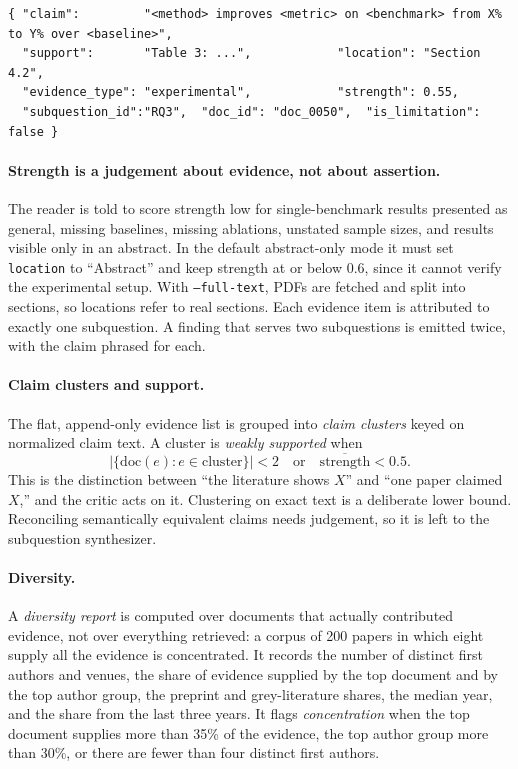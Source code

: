 \documentclass{article}
\newcommand{\code}[1]{\texttt{#1}}
\begin{document}
\begin{lstlisting}[caption={An evidence item (fields abridged).},label={lst:evidence},captionpos=b]
{ "claim":         "<method> improves <metric> on <benchmark> from X% to Y% over <baseline>",
  "support":       "Table 3: ...",            "location": "Section 4.2",
  "evidence_type": "experimental",            "strength": 0.55,
  "subquestion_id":"RQ3",  "doc_id": "doc_0050",  "is_limitation": false }
\end{lstlisting}

\paragraph{Strength is a judgement about evidence, not about assertion.}
The reader is told to score strength low for single-benchmark results
presented as general, missing baselines, missing ablations, unstated
sample sizes, and results visible only in an abstract. In the default
abstract-only mode it must set \code{location} to ``Abstract'' and keep
strength at or below $0.6$, since it cannot verify the experimental setup.
With \code{--full-text}, PDFs are fetched and split into sections, so
locations refer to real sections. Each evidence item is attributed to
exactly one subquestion. A finding that serves two subquestions is emitted
twice, with the claim phrased for each.

\paragraph{Claim clusters and support.} The flat, append-only evidence list
is grouped into \emph{claim clusters} keyed on normalized claim text. A
cluster is \emph{weakly supported} when
\begin{equation}
\bigl|\{\mathrm{doc}(e) : e \in \text{cluster}\}\bigr| < 2
\quad\text{or}\quad
\overline{\mathrm{strength}} < 0.5 .
\end{equation}
This is the distinction between ``the literature shows $X$'' and ``one paper
claimed $X$,'' and the critic acts on it. Clustering on exact text is a
deliberate lower bound. Reconciling semantically equivalent claims needs
judgement, so it is left to the subquestion synthesizer.

\paragraph{Diversity.} A \emph{diversity report} is computed over documents
that actually contributed evidence, not over everything retrieved: a corpus
of 200 papers in which eight supply all the evidence is concentrated. It
records the number of distinct first authors and venues, the share of
evidence supplied by the top document and by the top author group, the
preprint and grey-literature shares, the median year, and the share from
the last three years. It flags \emph{concentration} when the top document
supplies more than 35\% of the evidence, the top author group more than
30\%, or there are fewer than four distinct first authors.
\end{document}
